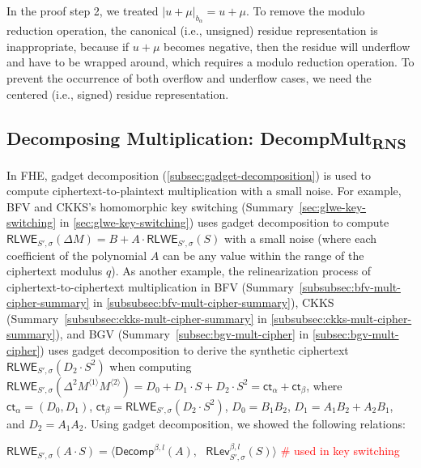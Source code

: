  In the proof step 2, we treated $|u + \mu|_{b_\alpha} = u + \mu$. To remove the modulo reduction operation, the canonical (i.e., unsigned) residue representation is inappropriate, because if $u + \mu$ becomes negative, then the residue will underflow and have to be wrapped around, which requires a modulo reduction operation. To prevent the occurrence of both overflow and underflow cases, we need the centered (i.e., signed) residue representation. 






\subsection{Decomposing Multiplication: \textsf{DecompMult\textsubscript{RNS}}}
\label{subsec:rns-decompmult}

In FHE, gadget decomposition (\autoref{subsec:gadget-decomposition}) is used to compute ciphertext-to-plaintext multiplication with a small noise. For example, BFV and CKKS's homomorphic key switching (Summary~\ref*{sec:glwe-key-switching} in \autoref{sec:glwe-key-switching}) uses gadget decomposition to compute $\textsf{RLWE}_{S',\sigma}(\Delta M) = B + A\cdot \textsf{RLWE}_{S', \sigma}(S)$ with a small noise (where each coefficient of the polynomial $A$ can be any value within the range of the ciphertext modulus $q$). As another example, the relinearization process of ciphertext-to-ciphertext multiplication in BFV (Summary~\ref*{subsubsec:bfv-mult-cipher-summary} in \autoref{subsubsec:bfv-mult-cipher-summary}), CKKS (Summary~\ref*{subsubsec:ckks-mult-cipher-summary} in \autoref{subsubsec:ckks-mult-cipher-summary}), and BGV (Summary~\ref*{subsec:bgv-mult-cipher} in \autoref{subsec:bgv-mult-cipher}) uses gadget decomposition to derive the synthetic ciphertext $\textsf{RLWE}_{S', \sigma}(D_2\cdot S^2)$ when computing $\textsf{RLWE}_{S',\sigma}(\Delta^2 M^{\langle 1 \rangle} M^{\langle 2 \rangle}) = D_0 + D_1\cdot S + D_2\cdot S^2 = \textsf{ct}_\alpha + \textsf{ct}_\beta$, where $\textsf{ct}_\alpha = (D_0, D_1)$, $\textsf{ct}_\beta = \textsf{RLWE}_{S', \sigma}(D_2\cdot S^2)$, $D_0 = B_1B_2$, $D_1 = A_1B_2 + A_2B_1$, and $D_2 = A_1A_2$. Using gadget decomposition, we showed the following relations: 

$\textsf{RLWE}_{S', \sigma}(A\cdot S) = \bm{\langle} \textsf{Decomp}^{\beta, l}(A), \text{ } \textsf{RLev}_{S', \sigma}^{\beta, l}(S) \bm{\rangle}$ \textcolor{red}{ \# used in key switching}

